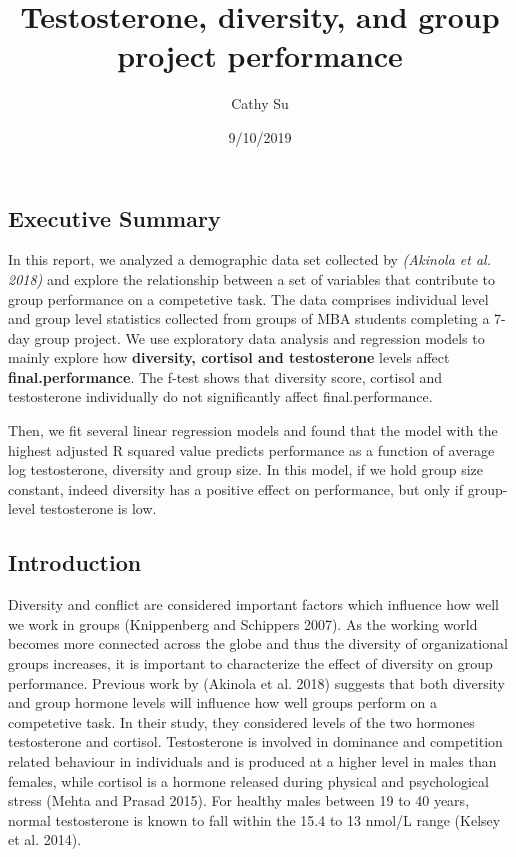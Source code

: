 \documentclass[]{article}
\title{Testosterone, diversity, and group project performance}
\author{Cathy Su}
\date{9/10/2019}
\begin{document}
\maketitle

\hypertarget{executive-summary}{%
\subsection{Executive Summary}\label{executive-summary}}

In this report, we analyzed a demographic data set collected by
\emph{(Akinola et al. 2018)} and explore the relationship between a set
of variables that contribute to group performance on a competetive task.
The data comprises individual level and group level statistics collected
from groups of MBA students completing a 7-day group project. We use
exploratory data analysis and regression models to mainly explore how
\textbf{diversity, cortisol and testosterone} levels affect
\textbf{final.performance}. The f-test shows that diversity score,
cortisol and testosterone individually do not significantly affect
final.performance.

Then, we fit several linear regression models and found that the model
with the highest adjusted R squared value predicts performance as a
function of average log testosterone, diversity and group size. In this
model, if we hold group size constant, indeed diversity has a positive
effect on performance, but only if group-level testosterone is low.

\hypertarget{introduction}{%
\subsection{Introduction}\label{introduction}}

Diversity and conflict are considered important factors which influence
how well we work in groups (Knippenberg and Schippers 2007). As the
working world becomes more connected across the globe and thus the
diversity of organizational groups increases, it is important to
characterize the effect of diversity on group performance. Previous work
by (Akinola et al. 2018) suggests that both diversity and group hormone
levels will influence how well groups perform on a competetive task. In
their study, they considered levels of the two hormones testosterone and
cortisol. Testosterone is involved in dominance and competition related
behaviour in individuals and is produced at a higher level in males than
females, while cortisol is a hormone released during physical and
psychological stress (Mehta and Prasad 2015). For healthy males between
19 to 40 years, normal testosterone is known to fall within the 15.4 to
13 nmol/L range (Kelsey et al. 2014).
\end{document}
